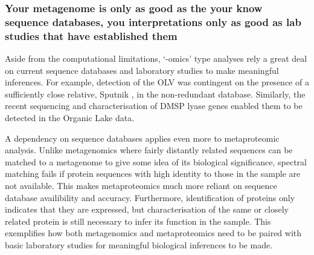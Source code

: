 
\subsubsection{Your metagenome is only as good as the your know sequence databases, you interpretations only as good as lab studies that have established them}
Aside from the computational limitations, `-omics' type analyses rely a great deal on current sequence databases and laboratory studies to make meaningful inferences.
For example, detection of the \ac{OLV} was contingent on the presence of a sufficiently close relative, Sputnik \cite{LaScola2008}, in the non-redundant database.
Similarly, the recent sequencing and characterisation of \ac{DMSP} lyase genes enabled them to be detected in the Organic Lake data.

A dependency on sequence databases applies even more to metaproteomic analysis.
Unlike metagenomics where fairly distantly related sequences can be matched to a metagenome to give some idea of its biological significance, spectral matching fails if protein sequences with high identity to those in the sample are not available.
This makes metaproteomics much more reliant on sequence database availibility and accuracy.
Furthermore, identification of proteins only indicates that they are expressed, but characterisation of the same or closely related protein is still necessary to infer its function in the sample.
This exemplifies how both metagenomics and metaproteomics need to be paired with basic laboratory studies for meaningful biological inferences to be made.

